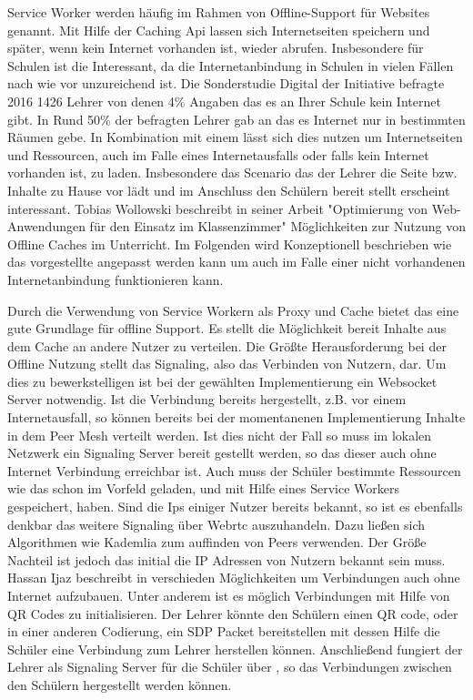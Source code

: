 Service Worker werden häufig im Rahmen von Offline-Support für Websites genannt. Mit Hilfe der Caching Api lassen sich Internetseiten speichern und später, wenn kein Internet vorhanden ist, wieder abrufen. Insbesondere für Schulen ist die Interessant, da die Internetanbindung in Schulen in vielen Fällen nach wie vor unzureichend ist. Die Sonderstudie Digital der Initiative befragte 2016 1426 Lehrer von denen 4\% Angaben das es an Ihrer Schule kein Internet gibt. In Rund 50\% der befragten Lehrer gab an das es Internet nur in bestimmten Räumen gebe.\cite{sonderstudie_digital} In Kombination mit einem \pTp \cdn lässt sich dies nutzen um Internetseiten und Ressourcen, auch im Falle eines Internetausfalls oder falls kein Internet vorhanden ist, zu laden. Insbesondere das Scenario das der Lehrer die Seite bzw. Inhalte zu Hause vor lädt und im Anschluss den Schülern bereit stellt erscheint interessant. Tobias Wollowski beschreibt in seiner Arbeit "Optimierung von Web-Anwendungen für den Einsatz im Klassenzimmer"\cite{tobi} Möglichkeiten zur Nutzung von Offline Caches im Unterricht. Im Folgenden wird Konzeptionell beschrieben wie das vorgestellte \pTp \cdn angepasst werden kann um auch im Falle einer nicht vorhandenen Internetanbindung funktionieren kann.

Durch die Verwendung von Service Workern als Proxy und Cache bietet das \cdn eine gute Grundlage für offline Support. Es stellt die Möglichkeit bereit Inhalte aus dem Cache an andere Nutzer zu verteilen. Die Größte Herausforderung bei der Offline Nutzung stellt das Signaling, also das Verbinden von Nutzern, dar. Um dies zu bewerkstelligen ist bei der gewählten Implementierung ein Websocket Server notwendig. Ist die Verbindung bereits hergestellt, z.B. vor einem Internetausfall, so können bereits bei der momentanenen Implementierung Inhalte in dem Peer Mesh verteilt werden. Ist dies nicht der Fall so muss im lokalen Netzwerk ein Signaling Server bereit gestellt werden, so das dieser auch ohne Internet Verbindung erreichbar ist. Auch muss der Schüler bestimmte Ressourcen wie das \pTp \cdn schon im Vorfeld geladen, und mit Hilfe eines Service Workers gespeichert, haben. Sind die Ips einiger Nutzer bereits bekannt, so ist es ebenfalls denkbar das weitere Signaling über Webrtc auszuhandeln. Dazu ließen sich Algorithmen wie Kademlia zum auffinden von Peers verwenden. Der Größe Nachteil ist jedoch das initial die IP Adressen von Nutzern bekannt sein muss. Hassan Ijaz\cite{signaling_no_i_patent} beschreibt in verschieden Möglichkeiten um \webrtc Verbindungen auch ohne Internet aufzubauen. Unter anderem ist es möglich \webrtc Verbindungen mit Hilfe von QR Codes zu initialisieren. Der Lehrer könnte den Schülern einen QR code, oder in einer anderen Codierung, ein SDP Packet bereitstellen mit dessen Hilfe die Schüler eine \webrtc Verbindung zum Lehrer herstellen können. Anschließend fungiert der Lehrer als Signaling Server für die Schüler über \webrtc, so das Verbindungen zwischen den Schülern hergestellt werden können.

